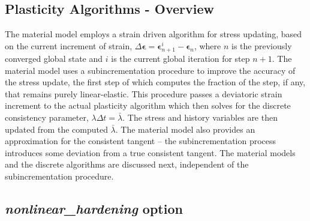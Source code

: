 \documentclass[11pt]{report}
\numberwithin{equation}{section}
\newcommand{\bmf } {\boldsymbol }
\newcommand{\bsf } [1]{\textrm{\textit{#1}}\xspace}
\begin{document}
\subsection {Plasticity Algorithms - Overview}
The material model employs a strain driven algorithm for stress updating, 
based on the current increment of strain, $\Delta \bmf \epsilon =
 \bmf \epsilon^i_{n+1}
- \bmf \epsilon_n$, where $n$ is the previously 
converged global state and $i$ is the current global iteration for step $n+1$. 
The material model uses a subincrementation procedure to improve the 
accuracy of the stress update, the first step of which computes the fraction 
of the step, if any, that remains purely linear-elastic. This procedure passes a 
deviatoric strain increment to the actual plasticity algorithm which then 
solves for the discrete consistency parameter, $\lambda \Delta t = \bar \lambda$. 
The stress and history 
variables are then updated from the computed $\bar \lambda$. The material model 
also provides an approximation for the consistent tangent -- the 
subincrementation process introduces some deviation from a true 
consistent tangent. The material models and the discrete algorithms 
are discussed next, independent of the subincrementation procedure. 

\subsection {\bsf{nonlinear\_hardening} option}
\end{document}
